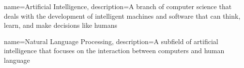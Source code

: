 {
    name={Artificial Intelligence},
    description={A branch of computer science that deals with the development of intelligent machines and software that can think, learn, and make decisions like humans}
}

{
    name={Natural Language Processing},
    description={A subfield of artificial intelligence that focuses on the interaction between computers and human language}
}
